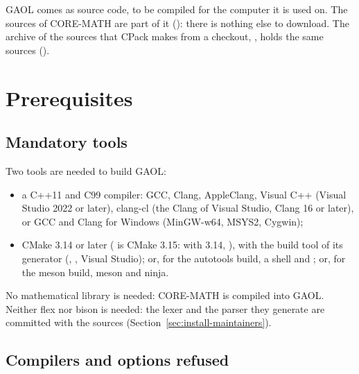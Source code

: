 GAOL comes as source code, to be compiled for the computer it is used on. The
sources of CORE-MATH are part of it (): there is nothing
else to download. The archive of the sources that CPack makes from a checkout,
, holds the same sources
().

\section{Prerequisites}

\subsection{Mandatory tools}
%

Two tools are needed to build GAOL:
\begin{itemize}
\item a C++11 and C99 compiler: GCC, Clang, AppleClang, Visual C++ (Visual
  Studio 2022 or later), clang-cl (the Clang of Visual Studio, Clang 16 or
  later), or GCC and Clang for Windows (MinGW-w64, MSYS2, Cygwin);
%
\item CMake 3.14 or later ( is CMake 3.15: with 3.14,
  ), with the build tool of its generator (,
  , Visual Studio); or, for the autotools build, a shell and
  ; or, for the meson build, meson and ninja.
\end{itemize}

\noindent
No mathematical library is needed: CORE-MATH is compiled into GAOL. Neither
flex nor bison is needed: the lexer and the parser they generate are committed
with the sources (Section~\ref{sec:install-maintainers}).

\subsection{Compilers and options refused}\label{sec:refused}
%

